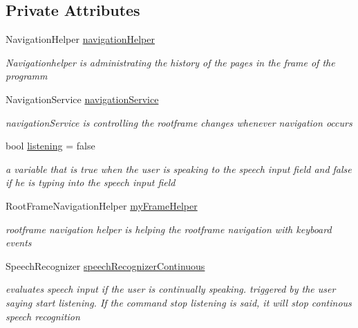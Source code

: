 \subsection*{Private Attributes}
\begin{DoxyCompactItemize}
\item 
Navigation\+Helper \hyperlink{class_listen_to_me_1_1_main_page_a9ad9fdc2f7159cbe2d495645459cffe8}{navigation\+Helper}
\begin{DoxyCompactList}\small\item\em Navigationhelper is administrating the history of the pages in the frame of the programm \end{DoxyCompactList}\item 
Navigation\+Service \hyperlink{class_listen_to_me_1_1_main_page_aff60f67b7f65b20f4df33be26d015bcf}{navigation\+Service}
\begin{DoxyCompactList}\small\item\em navigation\+Service is controlling the rootframe changes whenever navigation occurs \end{DoxyCompactList}\item 
bool \hyperlink{class_listen_to_me_1_1_main_page_ad46f69d6d70b9b13b74b4013b86ca608}{listening} = false
\begin{DoxyCompactList}\small\item\em a variable that is true when the user is speaking to the speech input field and false if he is typing into the speech input field \end{DoxyCompactList}\item 
Root\+Frame\+Navigation\+Helper \hyperlink{class_listen_to_me_1_1_main_page_a3185b88ec21f447708a2d3da983997e0}{my\+Frame\+Helper}
\begin{DoxyCompactList}\small\item\em rootframe navigation helper is helping the rootframe navigation with keyboard events \end{DoxyCompactList}\item 
Speech\+Recognizer \hyperlink{class_listen_to_me_1_1_main_page_ac417ca2ffe02d44895c029bf23e8f83a}{speech\+Recognizer\+Continuous}
\begin{DoxyCompactList}\small\item\em evaluates speech input if the user is continually speaking. triggered by the user saying start listening. If the command stop listening is said, it will stop continous speech recognition \end{DoxyCompactList}\item 

\end{DoxyCompactItemize}
